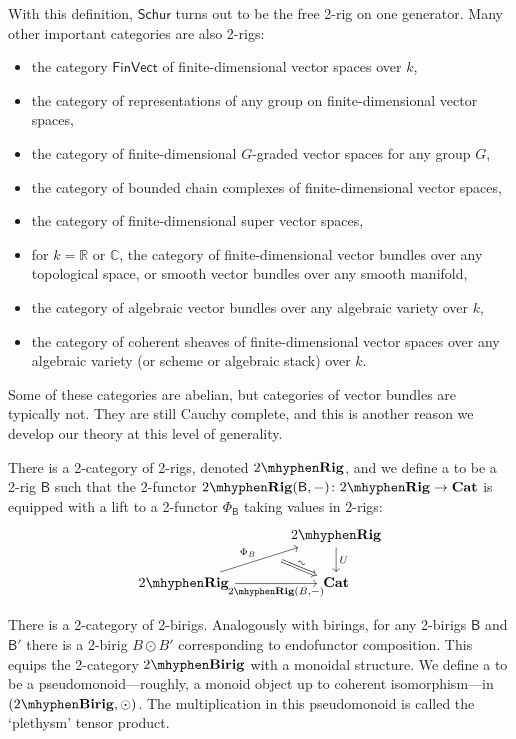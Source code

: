 \documentclass[12pt,reqno]{amsart}
\theoremstyle{plain}
\theoremstyle{definition}
\theoremstyle{remark}
\newcommand{\define}[1]{{\bf \boldmath{#1}}\index{#1}}
\newcommand{\maps}{\colon}
\newcommand{\category}[1]{\mathsf{#1}}
\newcommand{\B}{\category B}
\newcommand{\namedcat}[1]{\mathsf{#1}}
\newcommand{\Schur}{\namedcat{Schur}}
\newcommand{\TRig}{2\mhyphen\namedbicat{Rig}}
\newcommand{\TBirig}{2\mhyphen\namedbicat{Birig}}
\newcommand{\Vect}{\namedcat{Vect}}
\newcommand{\Fin}{\namedcat{Fin}}
\newcommand{\namedbicat}[1]{\mathbf{#1}}
\newcommand{\CCat}{\namedbicat{Cat}}
\numberwithin{thm}{section}
\begin{document}
With this definition, $\Schur$ turns out to be the free 2-rig on one generator. Many other important categories are also 2-rigs:
\begin{itemize}
    \item the category $\Fin\Vect$ of finite-dimensional vector spaces over $k$, 
    \item the category of representations of any group on finite-dimensional vector spaces, 
    \item the category of finite-dimensional $G$-graded vector spaces for any group $G$, 
    \item the category of bounded chain complexes of finite-dimensional vector spaces, 
    \item the category of finite-dimensional super vector spaces, 
    \item  for $k = \mathbb R$ or $\mathbb C$, the category of finite-dimensional vector bundles over any topological space, or smooth vector bundles over any smooth manifold, 
    \item  the category of algebraic vector bundles over any algebraic variety over $k$, 
    \item  the category of coherent sheaves of finite-dimensional vector spaces over any algebraic variety (or scheme or algebraic stack) over $k$.
\end{itemize}
Some of these categories are abelian, but categories of vector bundles are typically not. They are still Cauchy complete, and this is another reason we develop our theory at this level of generality.

There is a 2-category of 2-rigs, denoted $\TRig$, and we define a \define{2-birig} to be a 2-rig $\B$ such that the 2-functor $\TRig(\B, -) \maps \TRig \to \CCat$ is equipped with a lift to a 2-functor $\Phi_\B$ taking values in 2-rigs:
\[
\begin{tikzcd}[column sep = large]
    &
    \TRig
    \arrow[d, "U"]
    \\
    \TRig
    \arrow[ur, "\Phi_B"]
    \arrow[ur, swap, ""{name = phi}, phantom, bend right = 5, pos = 0.6]
    \arrow[r, swap, "{\TRig(B, -)}"]
    \arrow[from = phi, r, Rightarrow, "\sim", sloped]
    &
    \CCat
\end{tikzcd}
\]

There is a 2-category of 2-birigs. Analogously with birings, for any 2-birigs $\B$ and $\B'$ there is a 2-birig $B \odot B'$ corresponding to endofunctor composition. This equips the 2-category $\TBirig$ with a monoidal structure. We define a \define{2-plethory} to be a pseudomonoid---roughly, a monoid object up to coherent isomorphism---in $(\TBirig, \odot)$. The multiplication in this pseudomonoid is called the `plethysm' tensor product. 
\end{document}
